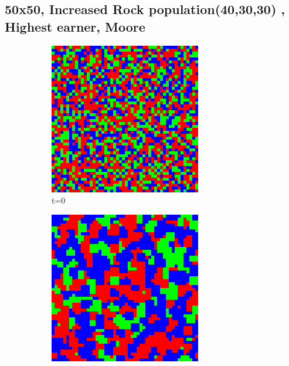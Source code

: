 \documentclass[a4paper, 11pt]{article}
\begin{document}
\newpage
\begin{landscape}
\subsection{50x50, Increased Rock population(40,30,30) , Highest earner, Moore}

\begin{figure}[H]
\centering
\begin{subfigure}{.20\textwidth}
  \centering
  \includegraphics[width=0.95\linewidth]{ROCK_PAPER_SCISSORS_MOORE_50x50_HighRockPop_t00}
  \caption{t=0}
\end{subfigure}%
\begin{subfigure}{.20\textwidth}
  \centering
  \includegraphics[width=0.95\linewidth]{ROCK_PAPER_SCISSORS_MOORE_50x50_HighRockPop_t01}

\end{subfigure}
\end{figure}
\end{landscape}
\end{document}
